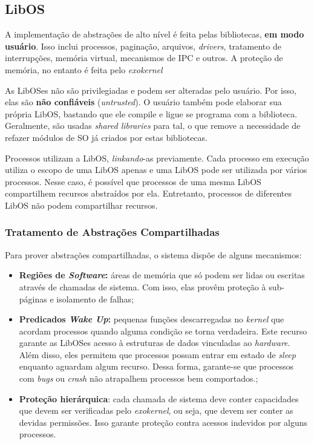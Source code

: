 \subsection{LibOS}
A implementação de abstrações de alto nível é feita pelas bibliotecas, \textbf{em modo usuário}. Isso inclui processos, paginação, arquivos, \textit{drivers}, tratamento de interrupções, memória virtual, mecanismos de IPC e outros. A proteção de memória, no entanto é feita pelo \textit{exokernel}

As LibOSes não são privilegiadas e podem ser alteradas pelo usuário. Por isso, elas são \textbf{não confiáveis} (\textit{untrusted}). O usuário também pode elaborar sua própria LibOS, bastando que ele compile e ligue se programa com a biblioteca. Geralmente, são usadas \textit{shared libraries} para tal, o que remove a necessidade de refazer módulos de SO já criados por estas bibliotecas.

Processos utilizam a LibOS, \textit{linkando}-as previamente. Cada processo em execução utiliza o escopo de uma LibOS apenas e uma LibOS pode ser utilizada por vários processos. Nesse caso, é possível que processos de uma mesma LibOS compartilhem recursos abstraídos por ela. Entretanto, processos de diferentes LibOS não podem compartilhar recursos.

\subsubsection{Tratamento de Abstrações Compartilhadas}
Para prover abstrações compartilhadas, o sistema dispõe de alguns mecanismos:

\begin{itemize}
  \item \textbf{Regiões de \textit{Software}:} áreas de memória que só podem ser lidas ou escritas através de chamadas de sistema. Com isso, elas provêm proteção à sub-páginas e isolamento de falhas;

  \item \textbf{Predicados \textit{Wake Up}:} pequenas funções descarregadas no \textit{kernel} que acordam processos quando alguma condição se torna verdadeira. Este recurso garante as LibOSes acesso à estruturas de dados vinculadas ao \textit{hardware}. Além disso, eles permitem que processos possam entrar em estado de \textit{sleep} enquanto aguardam algum recurso. Dessa forma, garante-se que processos com \textit{bugs} ou \textit{crash} não atrapalhem processos bem comportados.;

  \item \textbf{Proteção hierárquica}: cada chamada de sistema deve conter capacidades que devem ser verificadas pelo \textit{exokernel}, ou seja, que devem ser conter as devidas permissões. Isso garante proteção contra acessos indevidos por alguns processos.
\end{itemize}

